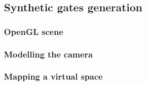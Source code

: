 \subsection{Synthetic gates generation}

	\subsubsection{OpenGL scene}
	\subsubsection{Modelling the camera}
	\subsubsection{Mapping a virtual space}
